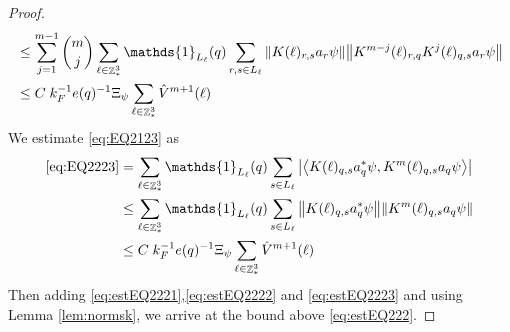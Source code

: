 \documentclass[sn-mathphys, Numbered ,a4paper]{sn-jnl}%
\DeclareMathOperator{\Z}{\mathbb{Z}}
\newcommand{\eva}[1]{\left\langle #1 \right\rangle}
\theoremstyle{plain}
\theoremstyle{definition}
\theoremstyle{remark}
\theoremstyle{plain}
\theoremstyle{definition}
\theoremstyle{remark}
\begin{document}
{\begin{proof}
\begin{align}
			&\leq \sum\limits_{j=1}^{m-1} {{m}\choose j} \sum\limits_{\ell \in \Z^3_*}\mathds{1}_{L_{\ell}}(q) \sum\limits_{r,s\in L_{\ell}}  \norm{ K(\ell)_{r,s} a_{r}\psi}\norm{ K^{m-j}(\ell)_{r,q} K^{j}(\ell)_{q,s} a_{r} \psi } \nonumber\\
			&\leq C\; k_F^{-1}e(q)^{-1}\Xi_{\psi} \sum\limits_{\ell \in \Z^3_*}\hat{V}^{m+1}(\ell) \label{eq:estEQ2222}
		\end{align}
		We estimate \eqref{eq:EQ2123} as 
		\begin{align}
			\eqref{eq:EQ2223}
			&=\sum\limits_{\ell \in \Z^3_*} \mathds{1}_{L_{\ell}}(q) \sum\limits_{ s \in L_{\ell}} \abs{\eva{K(\ell)_{q,s} a^*_{q} \psi, K^m(\ell)_{q,s}  a_{q} \psi }} \nonumber\\
			&\leq \sum\limits_{\ell \in \Z^3_*} \mathds{1}_{L_{\ell}}(q) \sum\limits_{ s \in L_{\ell}} \norm{K(\ell)_{q,s} a^*_{q} \psi}\norm{ K^m(\ell)_{q,s}  a_{q} \psi } \nonumber\\
			&\leq C\; k_F^{-1}e(q)^{-1}\Xi_{\psi} \sum\limits_{\ell \in \Z^3_*}\hat{V}^{m+1}(\ell) \label{eq:estEQ2223}
		\end{align} 
		Then adding \eqref{eq:estEQ2221},\eqref{eq:estEQ2222} and \eqref{eq:estEQ2223} and using Lemma \ref{lem:normsk}, we arrive at the bound above \eqref{eq:estEQ222}. 
\end{proof}}
\end{document}
